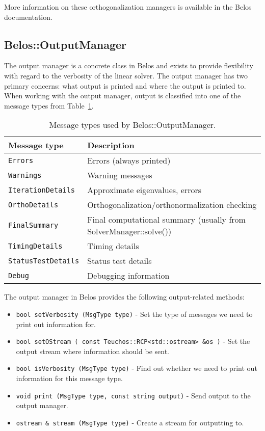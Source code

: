 More information on these orthogonalization managers is available in the Belos
documentation.

\subsection{Belos::OutputManager}
\label{sec:belos:printer}

The output manager is a concrete class in Belos and exists to provide
flexibility with regard to the verbosity of the linear solver. The output manager has
two primary concerns: what output is printed and where the output is printed to.
When working with the output manager, output is classified into one of the 
message types from Table~\ref{tab:belos:om}.

\begin{table}
\begin{center}
  \begin{tabular}{| p{4cm} p{8cm} |}
\hline
Message type & Description \\
\hline
{\tt Errors           } & Errors (always printed)  \\
{\tt Warnings         } & Warning messages   \\
{\tt IterationDetails } & Approximate eigenvalues, errors   \\
{\tt OrthoDetails     } & Orthogonalization/orthonormalization checking \\
{\tt FinalSummary     } & Final computational summary (usually from SolverManager::solve())  \\
{\tt TimingDetails    } & Timing details  \\
{\tt StatusTestDetails} & Status test details   \\
{\tt Debug            } & Debugging information \\
\hline
\end{tabular}
\caption{Message types used by Belos::OutputManager.}
\label{tab:belos:om}
\end{center}
\end{table}

The output manager in Belos provides the following output-related methods:
\begin{itemize}
  \item {\tt bool setVerbosity (MsgType type)} - 
  Set the type of messages we need to print out information for.
  \item {\tt bool setOStream ( const Teuchos::RCP<std::ostream> \&os )} - 
  Set the output stream where information should be sent.
  \item {\tt bool isVerbosity (MsgType type)} - 
  Find out whether we need to print out information for this message type.
\item {\tt void  print (MsgType type, const string output)} - 
  Send output to the output manager.
\item {\tt ostream \& stream (MsgType type)} - 
  Create a stream for outputting to.
\end{itemize}

